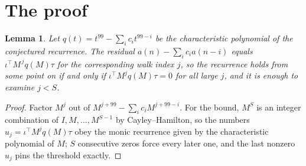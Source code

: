 \documentclass[11pt,a4paper]{article}
\theoremstyle{plain}
\newtheorem{lemma}[theorem]{Lemma}
\theoremstyle{definition}
\begin{document}
\section{The proof}

\begin{lemma}\label{lem:crit}
Let $q(t)=t^{99}-\sum_i c_it^{99-i}$ be the characteristic polynomial of the
conjectured recurrence. The residual $a(n)-\sum_ic_ia(n-i)$ equals
$\iota^{\!\top}M^{\,j}q(M)\tau$ for the corresponding walk index $j$, so the recurrence
holds from some point on if and only if $\iota^{\!\top}M^{j}q(M)\tau=0$ for all large $j$,
and it is enough to examine $j<S$.
\end{lemma}

\begin{proof}
Factor $M^{j}$ out of $M^{j+99}-\sum_ic_iM^{j+99-i}$. For the bound, $M^{S}$
is an integer combination of $I,M,\dots,M^{S-1}$ by Cayley--Hamilton, so the numbers
$u_j=\iota^{\!\top}M^{j}q(M)\tau$ obey the monic recurrence given by the characteristic
polynomial of $M$; $S$ consecutive zeros force every later one, and the last nonzero $u_j$
pins the threshold exactly.
\end{proof}
\end{document}
